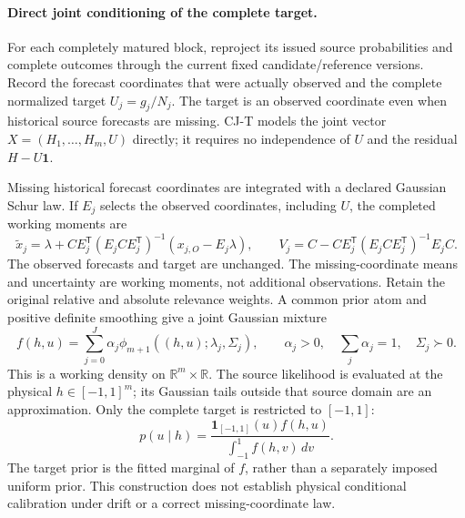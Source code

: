\paragraph{Direct joint conditioning of the complete target.}
For each completely matured block, reproject its issued source probabilities
and complete outcomes through the current fixed candidate/reference versions.
Record the forecast coordinates that were actually observed and the complete
normalized target $U_j=g_j/N_j$.  The target is an observed coordinate even
when historical source forecasts are missing.  CJ-T models the joint vector
$X=(H_1,\ldots,H_m,U)$ directly; it requires no independence of $U$ and the
residual $H-U\mathbf1$.

Missing historical forecast coordinates are integrated with a declared
Gaussian Schur law.  If $E_j$ selects the observed coordinates, including $U$,
the completed working moments are
\begin{equation}
 \widetilde x_j=\lambda+
 C E_j^{\mathsf T}(E_j C E_j^{\mathsf T})^{-1}(x_{j,O}-E_j\lambda),\qquad
 V_j=C-C E_j^{\mathsf T}(E_j C E_j^{\mathsf T})^{-1}E_j C.
 \label{cjt_masked_joint_completion}
\end{equation}
The observed forecasts and target are unchanged.  The missing-coordinate
means and uncertainty are working moments, not additional observations.
Retain the original relative and absolute relevance weights.  A common prior
atom and positive definite smoothing give a joint Gaussian mixture
\begin{equation}
 f(h,u)=\sum_{j=0}^{J}\alpha_j
 \phi_{m+1}((h,u);\lambda_j,\Sigma_j),\qquad
 \alpha_j>0,\quad\sum_j\alpha_j=1,\quad\Sigma_j\succ0.
 \label{cjt_joint_target_mixture}
\end{equation}
This is a working density on $\mathbb R^m\times\mathbb R$.
The source likelihood is evaluated at the physical $h\in[-1,1]^m$; its
Gaussian tails outside that source domain are an approximation.
Only the complete target is restricted to $[-1,1]$:
\begin{equation}
 p(u\mid h)=\frac{\mathbf1_{[-1,1]}(u)f(h,u)}
 {\int_{-1}^{1}f(h,v)\,dv}.
 \label{cjt_bounded_direct_target_posterior}
\end{equation}
The target prior is the fitted marginal of $f$, rather than a separately
imposed uniform prior.  This construction does not establish physical
conditional calibration under drift or a correct missing-coordinate law.

